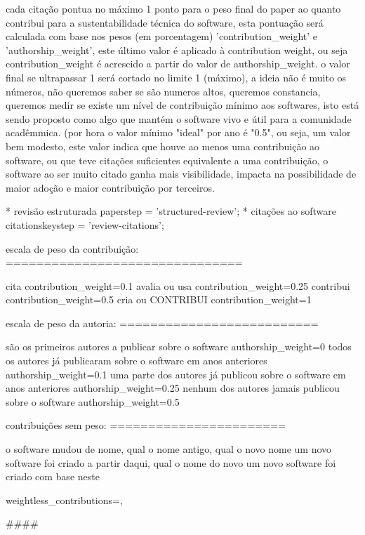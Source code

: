 cada citação pontua no máximo 1 ponto para o peso final do paper ao quanto
contribui para a sustentabilidade técnica do software, esta pontuação será
calculada com base nos pesos (em porcentagem) 'contribution_weight' e
'authorship_weight', este último valor é aplicado à contribution weight,
ou seja contribution_weight é acrescido a partir do valor de authorship_weight.
o valor final se ultrapassar 1 será cortado no limite 1 (máximo), a ideia não é muito
os números, não queremos saber se são numeros altos, queremos constancia, queremos
medir se existe um nível de contribuição mínimo aos softwares, isto está
sendo proposto como algo que mantém o software vivo e útil para a comunidade
acadêmmica. (por hora o valor mínimo "ideal" por ano é "0.5", ou seja, um
valor bem modesto, este valor indica que houve ao menos uma contribuição
ao software, ou que teve citações suficientes equivalente a uma contribuição,
o software ao ser muito citado ganha mais visibilidade, impacta na possibilidade
de maior adoção e maior contribuição por terceiros.

* revisão estruturada
   paper{step} = 'structured-review';
* citações ao software
   citations{key}{step} = 'review-citations';

escala de peso da contribuição:
===============================

cita
  contribution_weight=0.1
avalia ou usa
  contribution_weight=0.25
contribui
  contribution_weight=0.5
cria ou CONTRIBUI
  contribution_weight=1

escala de peso da autoria:
==========================

são os primeiros autores a publicar sobre o software
  authorship_weight=0
todos os autores já publicaram sobre o software em anos anteriores
  authorship_weight=0.1
uma parte dos autores já publicou sobre o software em anos anteriores
  authorship_weight=0.25
nenhum dos autores jamais publicou sobre o software
  authorship_weight=0.5

contribuições sem peso:
=======================

o software mudou de nome, qual o nome antigo, qual o novo nome
um novo software foi criado a partir daqui, qual o nome do novo
um novo software foi criado com base neste

  weightless_contributions={},

####

